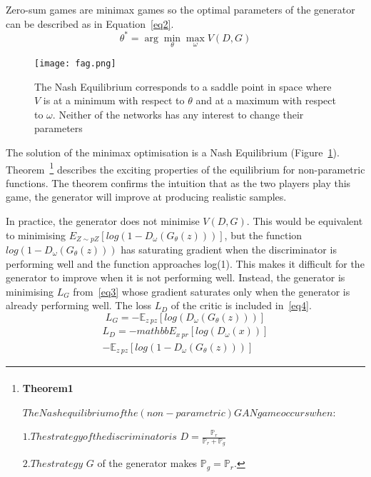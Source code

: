 \documentclass[10pt,twocolumn,letterpaper]{article}
\begin{document}
\par Zero-sum games are minimax games so the optimal parameters of the generator can be described as in Equation~\ref{eq2}.
\begin{equation}
\theta^{*}=\arg\min_{\theta}\max_{\omega}V(D,G)
\label{eq2}
\end{equation}
  \begin{figure}[!htb]
  	\centering
  	\texttt{[image: fag.png]}\\
  	\caption{The Nash Equilibrium corresponds to a saddle point in space where $V$ is at a minimum
  		with respect to $\theta$ and at a maximum with respect to $\omega$. Neither of the networks has any interest
  		to change their parameters}\label{Figure3} 
  \end{figure}
The solution of the minimax optimisation is a Nash Equilibrium (Figure~\ref{Figure3}). Theorem~\footnote{\paragraph{Theorem1}\label{key}$The Nash equilibrium of the (non-parametric) GAN game occurs when:$
	\par$1. The strategy of the discriminator is$ $D =\frac{\mathbb{P}_r}{\mathbb{P}_r+\mathbb{P}_g}$
	\par$2. The strategy$ $G$ of the generator makes $\mathbb{P}_g= \mathbb{P}_r$.} describes the exciting properties of the equilibrium for non-parametric functions.
The theorem confirms the intuition that as the two players play this game, the generator will improve at producing realistic samples.
\par In practice, the generator does not minimise $V(D,G)$. This would be equivalent to minimising $E_{Z∼pZ}[log(1 −D_{\omega}(G_{\theta}(z)))]$, but the function $log(1 − D_{\omega}(G_{\theta}(z)))$ has saturating gradient when the discriminator is performing well and the function approaches
log(1). This makes it difficult for the generator to improve when it is not performing well. Instead, the generator is minimising $L_G$ from~\ref{eq3} whose gradient saturates only when the generator is already performing well. The loss $L_D$ of the critic is included in~\ref{eq4}.
\begin{equation}
L_G=-\mathbb{E}_{z~pz}[log(D_\omega(G_\theta(z)))]
\label{eq3}
\end{equation}
\begin{equation}
\begin{split}
L_D=-mathbb{E}_{x~pr}[log(D_\omega(x))]
\\
-\mathbb{E}_{z~pz}[log(1-D_\omega(G_\theta(z)))]
\end{split}
\label{eq4}
\end{equation}
\end{document}
